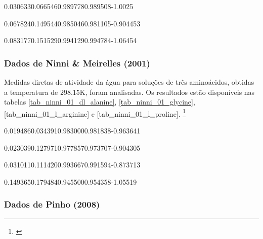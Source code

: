 %
	{0.030633}{0.066546}{0.989778}{0.989508}{-1.0025}

%
	{0.067824}{0.149544}{0.985046}{0.981105}{-0.904453}

%
	{0.083177}{0.151529}{0.994129}{0.994784}{-1.06454}

\FloatBarrier

\subsubsection{Dados de Ninni \& Meirelles (2001)}

Medidas diretas de atividade da água para soluções de três aminoácidos,
obtidas a temperatura de 298.15K, foram analisadas. Os resultados estão disponíveis
nas tabelas \ref{tab_ninni_01_dl_alanine}, \ref{tab_ninni_01_glycine},
\ref{tab_ninni_01_l_arginine} e \ref{tab_ninni_01_l_proline}.
\footnote{\cite{ninni2001}}

%
	{0.019486}{0.034391}{0.983000}{0.981838}{-0.963641}

%
	{0.023039}{0.127971}{0.977857}{0.973707}{-0.904305}

%
	{0.031011}{0.111420}{0.993667}{0.991594}{-0.873713}

%
	{0.149365}{0.179484}{0.945500}{0.954358}{-1.05519}

\FloatBarrier

\subsubsection{Dados de Pinho (2008)}


